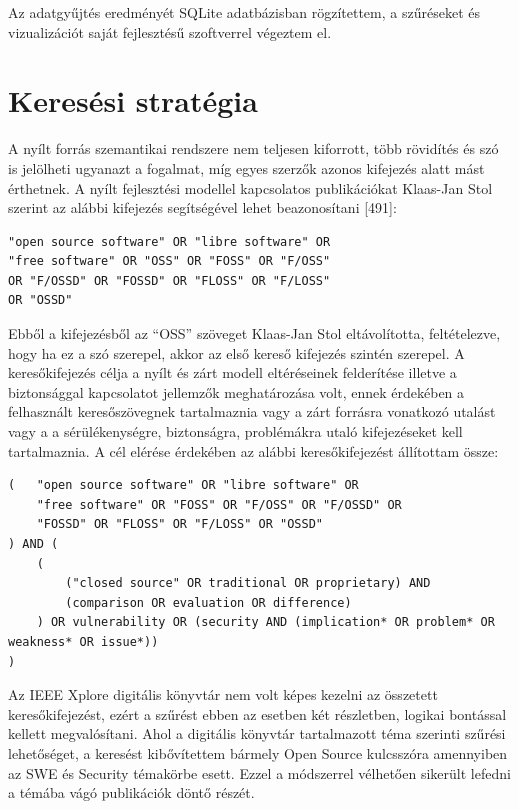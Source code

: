 \documentclass[12pt,magyar,a4paper,oneside]{scrreprt}
\begin{document}
Az adatgyűjtés eredményét SQLite adatbázisban rögzítettem, a szűréseket
és vizualizációt saját fejlesztésű szoftverrel végeztem el.

\hypertarget{keresuxe9si-stratuxe9gia}{%
\section{Keresési stratégia}\label{keresuxe9si-stratuxe9gia}}

A nyílt forrás szemantikai rendszere nem teljesen kiforrott, több
rövidítés és szó is jelölheti ugyanazt a fogalmat, míg egyes szerzők
azonos kifejezés alatt mást érthetnek. A nyílt fejlesztési modellel
kapcsolatos publikációkat Klaas-Jan Stol szerint az alábbi kifejezés
segítségével lehet beazonosítani {[}491{]}:

\begin{verbatim}
"open source software" OR "libre software" OR
"free software" OR "OSS" OR "FOSS" OR "F/OSS"
OR "F/OSSD" OR "FOSSD" OR "FLOSS" OR "F/LOSS"
OR "OSSD"
\end{verbatim}

Ebből a kifejezésből az ``OSS'' szöveget Klaas-Jan Stol eltávolította,
feltételezve, hogy ha ez a szó szerepel, akkor az első kereső kifejezés
szintén szerepel. A keresőkifejezés célja a nyílt és zárt modell
eltéréseinek felderítése illetve a biztonsággal kapcsolatot jellemzők
meghatározása volt, ennek érdekében a felhasznált keresőszövegnek
tartalmaznia vagy a zárt forrásra vonatkozó utalást vagy a a
sérülékenységre, biztonságra, problémákra utaló kifejezéseket kell
tartalmaznia. A cél elérése érdekében az alábbi keresőkifejezést
állítottam össze:

\begin{verbatim}
(   "open source software" OR "libre software" OR 
    "free software" OR "FOSS" OR "F/OSS" OR "F/OSSD" OR 
    "FOSSD" OR "FLOSS" OR "F/LOSS" OR "OSSD"
) AND (
    ( 
        ("closed source" OR traditional OR proprietary) AND 
        (comparison OR evaluation OR difference)
    ) OR vulnerability OR (security AND (implication* OR problem* OR weakness* OR issue*))
)
\end{verbatim}

Az IEEE Xplore digitális könyvtár nem volt képes kezelni az összetett
keresőkifejezést, ezért a szűrést ebben az esetben két részletben,
logikai bontással kellett megvalósítani. Ahol a digitális könyvtár
tartalmazott téma szerinti szűrési lehetőséget, a keresést kibővítettem
bármely Open Source kulcsszóra amennyiben az SWE és Security témakörbe
esett. Ezzel a módszerrel vélhetően sikerült lefedni a témába vágó
publikációk döntő részét.
\end{document}
